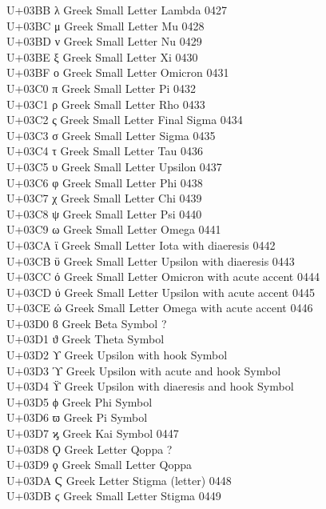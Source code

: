 \documentclass{article}
\begin{document}
U+03BB  λ Greek Small Letter Lambda 0427\\
U+03BC  μ Greek Small Letter Mu 0428\\
U+03BD  ν Greek Small Letter Nu 0429\\
U+03BE  ξ Greek Small Letter Xi 0430\\
U+03BF  ο Greek Small Letter Omicron  0431\\
U+03C0  π Greek Small Letter Pi 0432\\
U+03C1  ρ Greek Small Letter Rho  0433\\
U+03C2  ς Greek Small Letter Final Sigma  0434\\
U+03C3  σ Greek Small Letter Sigma  0435\\
U+03C4  τ Greek Small Letter Tau  0436\\
U+03C5  υ Greek Small Letter Upsilon  0437\\
U+03C6  φ Greek Small Letter Phi  0438\\
U+03C7  χ Greek Small Letter Chi  0439\\
U+03C8  ψ Greek Small Letter Psi  0440\\
U+03C9  ω Greek Small Letter Omega  0441\\
U+03CA  ϊ Greek Small Letter Iota with diaeresis  0442\\
U+03CB  ϋ Greek Small Letter Upsilon with diaeresis 0443\\
U+03CC  ό Greek Small Letter Omicron with acute accent  0444\\
U+03CD  ύ Greek Small Letter Upsilon with acute accent  0445\\
U+03CE  ώ Greek Small Letter Omega with acute accent  0446\\
U+03D0  ϐ Greek Beta Symbol ?\\
U+03D1  ϑ Greek Theta Symbol\\
U+03D2  ϒ Greek Upsilon with hook Symbol\\
U+03D3  ϓ Greek Upsilon with acute and hook Symbol\\
U+03D4  ϔ Greek Upsilon with diaeresis and hook Symbol\\
U+03D5  ϕ Greek Phi Symbol\\
U+03D6  ϖ Greek Pi Symbol\\
U+03D7  ϗ Greek Kai Symbol  0447\\
U+03D8  Ϙ Greek Letter Qoppa  ?\\
U+03D9  ϙ Greek Small Letter Qoppa\\
U+03DA  Ϛ Greek Letter Stigma (letter)  0448\\
U+03DB  ϛ Greek Small Letter Stigma 0449\\
\end{document}
